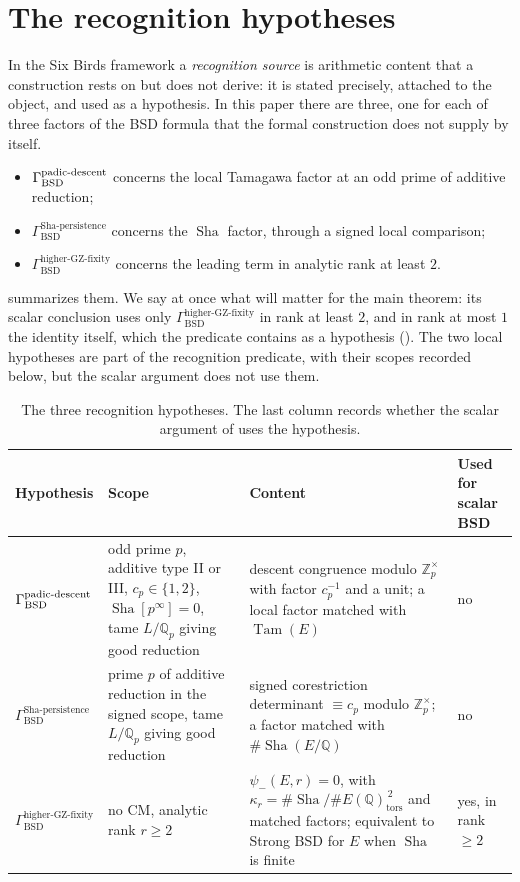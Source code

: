 \documentclass[11pt]{article}
\theoremstyle{definition}
\newcommand{\Q}{\mathbb{Q}}
\newcommand{\Qp}{\mathbb{Q}_p}
\newcommand{\Zp}{\mathbb{Z}_p}
\newcommand{\Sha}{\operatorname{Sha}}
\newcommand{\Tam}{\operatorname{Tam}}
\newcommand{\tors}{\operatorname{tors}}
\newcommand{\kapr}{\kappa_r}
\newcommand{\GammaSP}{\Gamma_{\mathrm{BSD}}^{\mathrm{Sha\text{-}persistence}}}
\newcommand{\GammaGZ}{\Gamma_{\mathrm{BSD}}^{\mathrm{higher\text{-}GZ\text{-}fixity}}}
\begin{document}
 \section{The recognition hypotheses}
\label{sec:recognition-sources}


In the Six Birds framework a \emph{recognition source} is arithmetic
content that a construction rests on but does not derive: it is stated
precisely, attached to the object, and used as a hypothesis.  In this
paper there are three, one for each of three factors of the BSD formula
that the formal construction does not supply by itself.
\begin{itemize}
\item $\Gamma_{\mathrm{BSD}}^{\mathrm{padic\text{-}descent}}$ concerns the local Tamagawa factor at an odd prime of
  additive reduction;
\item $\GammaSP$ concerns the $\Sha$ factor, through a signed local
  comparison;
\item $\GammaGZ$ concerns the leading term in analytic rank at least $2$.
\end{itemize}
 summarizes them.  We say at once what will
matter for the main theorem: its scalar conclusion uses only $\GammaGZ$ in
rank at least $2$, and in rank at most $1$ the identity itself,
which the predicate contains as a hypothesis
().  The two local hypotheses are part of the
recognition predicate, with their scopes recorded below, but the scalar
argument does not use them.
\begin{table}[tbp]
\centering
\footnotesize
\caption{The three recognition hypotheses.  The last column records
whether the scalar argument of 
uses the hypothesis.}
\label{tab:recognition-sources}
\begin{tabularx}{\textwidth}{@{}>{\raggedright\arraybackslash}p{}
>{\raggedright\arraybackslash}p{}
>{\raggedright\arraybackslash}X
>{\raggedright\arraybackslash}p{}@{}}
\toprule
Hypothesis & Scope & Content & Used for scalar BSD \\
\midrule
\(\Gamma_{\mathrm{BSD}}^{\mathrm{padic\text{-}descent}}\) & odd prime \(p\), additive type II or III, \(c_p\in\{1,2\}\),
\(\Sha[p^\infty]=0\), tame \(L/\Qp\) giving good reduction & descent congruence
modulo \(\Zp^\times\) with factor \(c_p^{-1}\) and a unit; a local factor
matched with \(\Tam(E)\) & no \\
\addlinespace
\(\GammaSP\) & prime \(p\) of additive reduction in the signed scope, tame \(L/\Qp\) giving good reduction & signed corestriction determinant \(\equiv c_p\)
modulo \(\Zp^\times\); a factor matched with \(\#\Sha(E/\Q)\) & no \\
\addlinespace
\(\GammaGZ\) & no CM, analytic rank \(r\ge2\) & \(\psi_-(E,r)=0\), with
\(\kapr=\#\Sha/\#E(\Q)_{\tors}^{\,2}\) and matched factors; equivalent to
Strong BSD for \(E\) when \(\Sha\) is finite & yes, in rank \(\ge2\) \\
\bottomrule
\end{tabularx}
\end{table}
 
\end{document}
